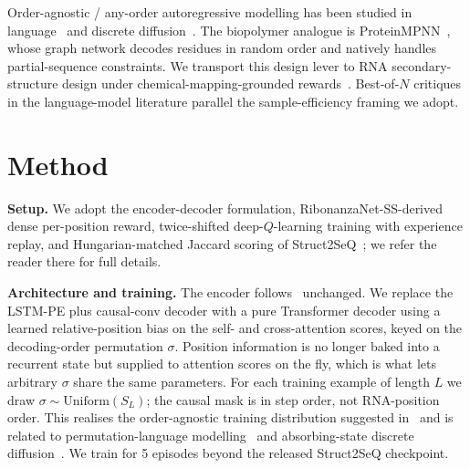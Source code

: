\documentclass{article}
\begin{document}
Order-agnostic / any-order autoregressive modelling has been studied
in language~\citep{yang2019xlnet,du2021oaxe,hoogeboom2022ardm} and
discrete diffusion~\citep{austin2021d3pm,chang2022maskgit}. The
biopolymer analogue is ProteinMPNN~\citep{dauparas2022proteinmpnn},
whose graph network decodes residues in random order and natively
handles partial-sequence constraints. We transport this design lever
to RNA secondary-structure design under chemical-mapping-grounded
rewards~\citep{lee2014eterna,he2024ribonanza,waymentsteele2022switches}.
Best-of-$N$ critiques in the language-model literature
\citep{lightman2024verify,wang2023selfconsistency} parallel the
sample-efficiency framing we adopt.

\section{Method}
\label{sec:method}

\noindent\textbf{Setup.} We adopt the encoder-decoder formulation,
RibonanzaNet-SS-derived dense per-position reward, twice-shifted
deep-$Q$-learning training with experience replay, and Hungarian-matched
Jaccard scoring of Struct2SeQ~\citep{he2026struct2seq,he2024ribonanza,
mnih2015dqn}; we refer the reader there for full details.

\noindent\textbf{Architecture and training.} The encoder
follows~\citet{he2026struct2seq} unchanged. We replace the LSTM-PE
plus causal-conv decoder with a pure Transformer decoder using a
learned relative-position bias on the self- and cross-attention
scores, keyed on the decoding-order permutation $\sigma$. Position
information is no longer baked into a recurrent state but supplied to
attention scores on the fly, which is what lets arbitrary $\sigma$
share the same parameters. For each training example of length $L$ we
draw $\sigma \sim \mathrm{Uniform}(S_L)$; the causal mask is in step
order, not RNA-position order. This realises the order-agnostic
training distribution suggested in~\citet[\S 4]{he2026struct2seq} and
is related to permutation-language modelling~\citep{yang2019xlnet}
and absorbing-state discrete
diffusion~\citep{austin2021d3pm,hoogeboom2022ardm}. We train for 5
episodes beyond the released Struct2SeQ checkpoint.
\end{document}
